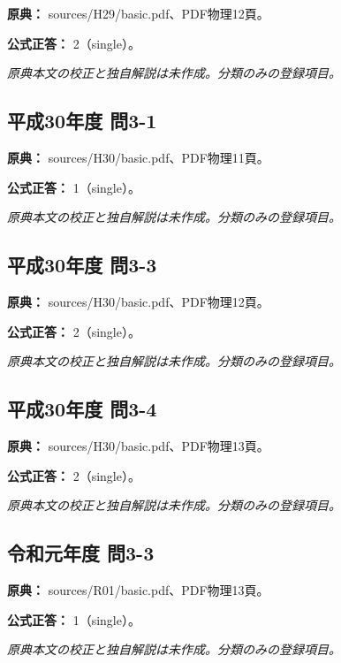 \noindent\textbf{原典：} sources/H29/basic.pdf、PDF物理12頁。

\textbf{公式正答：} 2（single）。

\par\textit{原典本文の校正と独自解説は未作成。分類のみの登録項目。}

\subsection{平成30年度 問3-1}
\label{q:h30-reg-basic-3-1}

\noindent\textbf{原典：} sources/H30/basic.pdf、PDF物理11頁。

\textbf{公式正答：} 1（single）。

\par\textit{原典本文の校正と独自解説は未作成。分類のみの登録項目。}

\subsection{平成30年度 問3-3}
\label{q:h30-reg-basic-3-3}

\noindent\textbf{原典：} sources/H30/basic.pdf、PDF物理12頁。

\textbf{公式正答：} 2（single）。

\par\textit{原典本文の校正と独自解説は未作成。分類のみの登録項目。}

\subsection{平成30年度 問3-4}
\label{q:h30-reg-basic-3-4}

\noindent\textbf{原典：} sources/H30/basic.pdf、PDF物理13頁。

\textbf{公式正答：} 2（single）。

\par\textit{原典本文の校正と独自解説は未作成。分類のみの登録項目。}

\subsection{令和元年度 問3-3}
\label{q:r01-reg-basic-3-3}

\noindent\textbf{原典：} sources/R01/basic.pdf、PDF物理13頁。

\textbf{公式正答：} 1（single）。

\par\textit{原典本文の校正と独自解説は未作成。分類のみの登録項目。}

